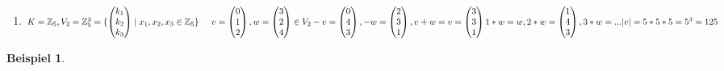 \documentclass[a4paper,11pt]{article}
\newtheorem{bsp}[definition]{Beispiel}
\begin{document}
\begin{enumerate}[label=\alph*)]
\item $K=\mathbb{Z}_5, V_2=\mathbb{Z}^3_5=\{\begin{pmatrix}k_1\\k_2\\k_3\end{pmatrix}\mid x_1,x_2,x_3\in\mathbb{Z}_5\}\hspace{5mm}v=\begin{pmatrix}0\\1\\2\end{pmatrix}, w=\begin{pmatrix}3\\2\\4\end{pmatrix}\in V_2 \\
-v=\begin{pmatrix}0\\4\\3\end{pmatrix}, -w=\begin{pmatrix}2\\3\\1\end{pmatrix}, v+w=v=\begin{pmatrix}3\\3\\1\end{pmatrix} \\
1*w=w, 2*w=\begin{pmatrix}1\\4\\3\end{pmatrix}, 3*w=... \\
\vert v\vert=5*5*5=5^3=125$
\end{enumerate}
\begin{bsp}
\end{bsp}
\end{document}
